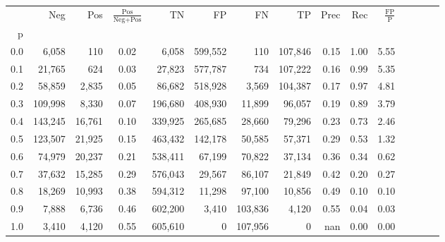 \begin{tabular}{rrrcrrrrrrrrrrr}
\toprule
{} &      Neg &     Pos & $\frac{\text{Pos}}{\text{Neg}+\text{Pos}}$ &       TN &       FP &       FN &       TP &  Prec &   Rec & $\frac{\text{FP}}{\text{P}}$ \\
p   &          &         &                                            &          &          &          &          &       &       &                              \\
\midrule
0.0 &    6,058 &     110 &                                       0.02 &    6,058 &  599,552 &      110 &  107,846 &  0.15 &  1.00 &                         5.55 \\
0.1 &   21,765 &     624 &                                       0.03 &   27,823 &  577,787 &      734 &  107,222 &  0.16 &  0.99 &                         5.35 \\
0.2 &   58,859 &   2,835 &                                       0.05 &   86,682 &  518,928 &    3,569 &  104,387 &  0.17 &  0.97 &                         4.81 \\
0.3 &  109,998 &   8,330 &                                       0.07 &  196,680 &  408,930 &   11,899 &   96,057 &  0.19 &  0.89 &                         3.79 \\
0.4 &  143,245 &  16,761 &                                       0.10 &  339,925 &  265,685 &   28,660 &   79,296 &  0.23 &  0.73 &                         2.46 \\
0.5 &  123,507 &  21,925 &                                       0.15 &  463,432 &  142,178 &   50,585 &   57,371 &  0.29 &  0.53 &                         1.32 \\
0.6 &   74,979 &  20,237 &                                       0.21 &  538,411 &   67,199 &   70,822 &   37,134 &  0.36 &  0.34 &                         0.62 \\
0.7 &   37,632 &  15,285 &                                       0.29 &  576,043 &   29,567 &   86,107 &   21,849 &  0.42 &  0.20 &                         0.27 \\
0.8 &   18,269 &  10,993 &                                       0.38 &  594,312 &   11,298 &   97,100 &   10,856 &  0.49 &  0.10 &                         0.10 \\
0.9 &    7,888 &   6,736 &                                       0.46 &  602,200 &    3,410 &  103,836 &    4,120 &  0.55 &  0.04 &                         0.03 \\
1.0 &    3,410 &   4,120 &                                       0.55 &  605,610 &        0 &  107,956 &        0 &   nan &  0.00 &                         0.00 \\
\bottomrule
\end{tabular}
